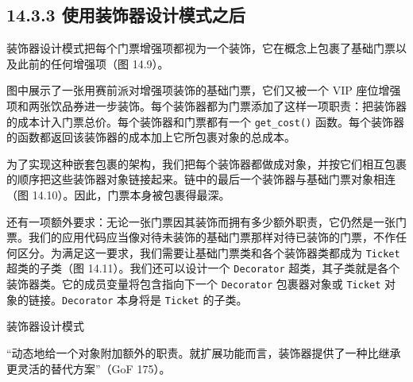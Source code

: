 \subsection{14.3.3 使用装饰器设计模式之后}

装饰器设计模式把每个门票增强项都视为一个装饰，它在概念上包裹了基础门票以及此前的任何增强项（图 14.9）。


图中展示了一张用赛前派对增强项装饰的基础门票，它们又被一个 VIP 座位增强项和两张饮品券进一步装饰。每个装饰器都为门票添加了这样一项职责：把装饰器的成本计入门票总价。每个装饰器和门票都有一个 \texttt{get\_\allowbreak{}cost(\allowbreak{})\allowbreak{}} 函数。每个装饰器的函数都返回该装饰器的成本加上它所包裹对象的总成本。

为了实现这种嵌套包裹的架构，我们把每个装饰器都做成对象，并按它们相互包裹的顺序把这些装饰器对象链接起来。链中的最后一个装饰器与基础门票对象相连（图 14.10）。因此，门票本身被包裹得最深。


还有一项额外要求：无论一张门票因其装饰而拥有多少额外职责，它仍然是一张门票。我们的应用代码应当像对待未装饰的基础门票那样对待已装饰的门票，不作任何区分。为满足这一要求，我们需要让基础门票类和各个装饰器类都成为 \texttt{Ticket} 超类的子类（图 14.11）。我们还可以设计一个 \texttt{Decorator} 超类，其子类就是各个装饰器类。它的成员变量将包含指向下一个 \texttt{Decorator} 包裹器对象或 \texttt{Ticket} 对象的链接。\texttt{Decorator} 本身将是 \texttt{Ticket} 的子类。

\begin{mySidebar}{装饰器设计模式}

“动态地给一个对象附加额外的职责。就扩展功能而言，装饰器提供了一种比继承更灵活的替代方案”（GoF 175）。
\end{mySidebar}


